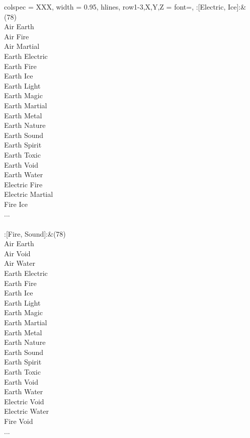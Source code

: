 \begin{longtblr}[
	caption = {2v2 Defending Weak},
	label = {2v2-Defending-Weak},
]{
	colspec = {XXX}, width = 0.95\linewidth,
	hlines,
	row{1-3,X,Y,Z} = {font=\bfseries},
}
	:[Electric, Ice]:&{(78)\\
	Air Earth \\
	Air Fire \\
	Air Martial \\
	Earth Electric \\
	Earth Fire \\
	Earth Ice \\
	Earth Light \\
	Earth Magic \\
	Earth Martial \\
	Earth Metal \\
	Earth Nature \\
	Earth Sound \\
	Earth Spirit \\
	Earth Toxic \\
	Earth Void \\
	Earth Water \\
	Electric Fire \\
	Electric Martial \\
	Fire Ice \\
	...\\
	}\\

	:[Fire, Sound]:&{(78)\\
	Air Earth \\
	Air Void \\
	Air Water \\
	Earth Electric \\
	Earth Fire \\
	Earth Ice \\
	Earth Light \\
	Earth Magic \\
	Earth Martial \\
	Earth Metal \\
	Earth Nature \\
	Earth Sound \\
	Earth Spirit \\
	Earth Toxic \\
	Earth Void \\
	Earth Water \\
	Electric Void \\
	Electric Water \\
	Fire Void \\
	...\\
	}\\


\end{longtblr}

